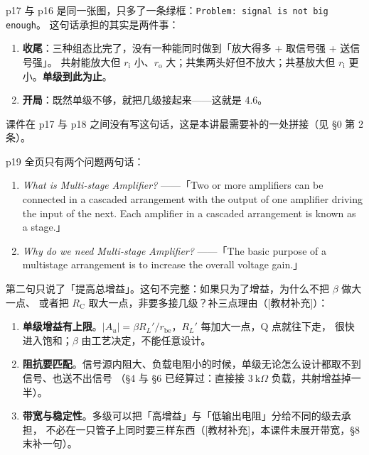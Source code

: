 \documentclass[11pt]{ctexart}
\begin{document}

p17 与 p16 是同一张图，只多了一条绿框：\texttt{Problem: signal is not big enough}。
这句话承担的其实是两件事：
\begin{enumerate}
\item \textbf{收尾}：三种组态比完了，没有一种能同时做到「放大得多 + 取信号强 + 送信号强」。
共射能放大但 $r_{\mathrm{i}}$ 小、$r_{\mathrm{o}}$ 大；共集两头好但不放大；共基放大但 $r_{\mathrm{i}}$ 更小。\textbf{单级到此为止}。
\item \textbf{开局}：既然单级不够，就把几级接起来——这就是 4.6。
\end{enumerate}
课件在 p17 与 p18 之间没有写这句话，这是本讲最需要补的一处拼接（见 §0 第 2 条）。



p19 全页只有两个问题两句话：
\begin{enumerate}
\item \textit{What is Multi-stage Amplifier?} ——「Two or more amplifiers can be connected in a cascaded arrangement
with the output of one amplifier driving the input of the next. Each amplifier in a cascaded arrangement is known as a stage.」
\item \textit{Why do we need Multi-stage Amplifier?} ——「The basic purpose of a multistage arrangement is to increase the overall voltage gain.」
\end{enumerate}
第二句只说了「提高总增益」。这句不完整：如果只为了增益，为什么不把 $\beta$ 做大一点、
或者把 $R_{\mathrm{C}}$ 取大一点，非要多接几级？补三点理由（[教材补充]）：
\begin{enumerate}
\item \textbf{单级增益有上限}。$|A_u|=\beta R_L'/r_{\mathrm{be}}$，$R_L'$ 每加大一点，Q 点就往下走，
很快进入饱和；$\beta$ 由工艺决定，不能任意设计。
\item \textbf{阻抗要匹配}。信号源内阻大、负载电阻小的时候，单级无论怎么设计都取不到信号、也送不出信号
（§4 与 §6 已经算过：直接接 $3\ \mathrm{k}\Omega$ 负载，共射增益掉一半）。
\item \textbf{带宽与稳定性}。多级可以把「高增益」与「低输出电阻」分给不同的级去承担，
不必在一只管子上同时要三样东西（[教材补充]，本课件未展开带宽，§8 末补一句）。
\end{enumerate}

\end{document}
